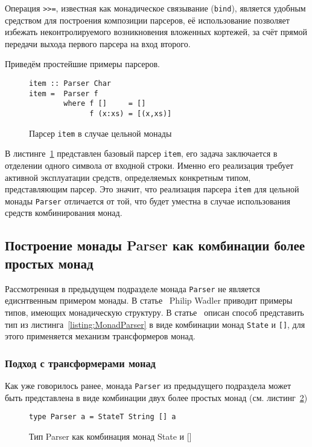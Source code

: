 Операция \lstinline{>>=}, известная как монадическое связывание (\lstinline{bind}), является удобным средством для построения композиции парсеров, её использование позволяет избежать неконтролируемого возникновения вложенных кортежей, за счёт прямой передачи выхода первого парсера на вход второго.

Приведём простейшие примеры парсеров.

\begin{figure}[h]
  \begin{lstlisting}
item :: Parser Char
item =  Parser f
        where f []     = []
              f (x:xs) = [(x,xs)]
  \end{lstlisting}
  \caption{Парсер \lstinline{item} в случае цельной монады}
  \label{listing:ParserItem}
\end{figure}

В листинге~\ref{listing:ParserItem} представлен базовый парсер \lstinline{item}, его задача заключается в отделении одного символа от входной строки. Именно его реализация требует активной эксплуатации средств, определяемых конкретным типом, представляющим парсер. Это значит, что реализация парсера \lstinline{item} для цельной монады \lstinline{Parser} отличается от той, что будет уместна в случае использования средств комбинирования монад.

\subsection{Построение монады Parser как комбинации более простых монад}

Рассмотренная в предыдущем подразделе монада \lstinline{Parser} не является едиснтвенным примером монады. В статье~\autocite{WadlerMonads} Philip Wadler приводит примеры типов, имеющих монадическую структуру. В статье~\autocite{MonParsing} описан способ представить тип из листинга~\ref{listing:MonadParser} в виде комбинации монад \lstinline{State} и \lstinline{[]}, для этого применяется механизм трансформеров монад.

\subsubsection{Подход с трансформерами монад}

Как уже говорилось ранее, монада \lstinline{Parser} из предыдущего подраздела может быть представлена в виде комбинации двух более простых монад (см. листинг~\ref{listing:MonadTransParser})

\begin{figure}[h]
\begin{lstlisting}
type Parser a = StateT String [] a
\end{lstlisting}
\caption{Тип Parser как комбинация монад State и []}
\label{listing:MonadTransParser}
\end{figure}

